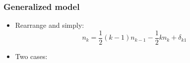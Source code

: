\begin{frame}
  \frametitle{Generalized model}

  \begin{itemize}
  \item<1->
    Rearrange and simply:
    $$
    n_k
    =
    \frac{1}{2}
    (k-1) n_{k-1} 
    - 
    \frac{1}{2}
    k n_{k}
    + \delta_{k1}
    $$
  \item<3->
    Two cases:
  \end{itemize}
  
\end{frame}

